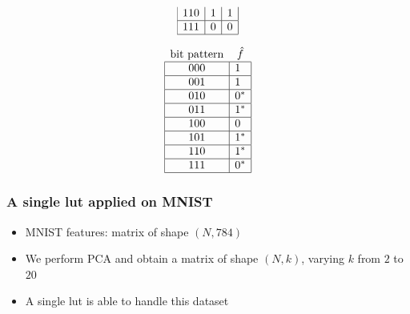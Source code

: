 \documentclass[pdflatex,compress]{beamer}
\begin{document}
\begin{frame}
\begin{minipage}{.95\linewidth}
\begin{minipage}[b]{.4\linewidth}
\begin{align*}
\begin{array}{ccc}
						\multicolumn{1}{|c|}{110} & \multicolumn{1}{c|}{1} & \multicolumn{1}{c|}{1}                \\ \hline
						\multicolumn{1}{|c|}{111} & \multicolumn{1}{c|}{0} & \multicolumn{1}{c|}{0}                \\ \hline
					\end{array}
				\end{align*}
			\end{minipage}
			\begin{minipage}[b]{.3\linewidth}\centering
				\begin{align*}
					\begin{array}{cc}
						\text{bit pattern}        & \hat{f}                  \\ \hline
						\multicolumn{1}{|c|}{000} & \multicolumn{1}{l|}{1}   \\ \hline
						\multicolumn{1}{|c|}{001} & \multicolumn{1}{l|}{1}   \\ \hline
						\multicolumn{1}{|c|}{010} & \multicolumn{1}{l|}{0^*} \\ \hline
						\multicolumn{1}{|c|}{011} & \multicolumn{1}{l|}{1^*} \\ \hline
						\multicolumn{1}{|c|}{100} & \multicolumn{1}{l|}{0}   \\ \hline
						\multicolumn{1}{|c|}{101} & \multicolumn{1}{l|}{1^*}  \\ \hline
						\multicolumn{1}{|c|}{110} & \multicolumn{1}{l|}{1^*}  \\ \hline
						\multicolumn{1}{|c|}{111} & \multicolumn{1}{l|}{0^*} \\ \hline
					\end{array}
				\end{align*}
			\end{minipage}
			\normalfont
		\end{minipage}
\end{frame}

\begin{frame}
	\frametitle{A single lut applied on MNIST}
	\begin{itemize}
		\item MNIST features: matrix of shape $(N, 784)$
			\vspace{1em}
		\item We perform PCA and obtain a matrix of shape $(N, k)$, varying $k$ from $2$ to $20$
			\vspace{1em}
		\item A single lut is able to handle this dataset
	\end{itemize}
\end{frame}
\end{document}
